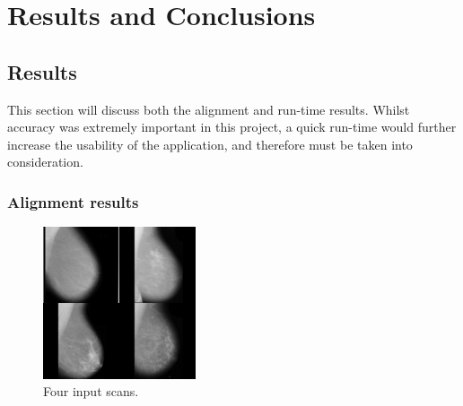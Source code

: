 \chapter{Results and Conclusions}




\section{Results}

This section will discuss both the alignment and run-time results. Whilst accuracy was extremely important in this project, a quick run-time would further increase the usability of the application, and therefore must be taken into consideration.

\subsection{Alignment results}

\begin{figure}[H]
  \centering
  \includegraphics[width=0.4\textwidth]{Chapter3/results-img/big_scan.png}
  \caption{Four input scans.}
  \label{fig:input-data}
\end{figure}

